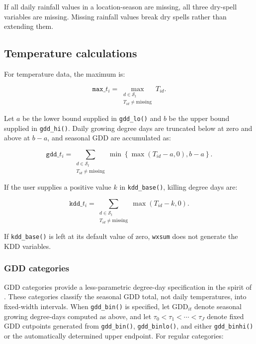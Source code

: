 If all daily rainfall values in a location-season are missing, all three dry-spell variables are missing. Missing rainfall values break dry spells rather than extending them.

\subsection{Temperature calculations}

For temperature data, the maximum is:

\begin{equation}
	\texttt{max\_} t_i = \max_{\substack{d \in \mathcal{S}_{t} \\ T_{id} \neq \text{missing}}} T_{id}.
\end{equation}

Let $a$ be the lower bound supplied in \texttt{gdd\_lo()} and $b$ be the upper bound supplied in \texttt{gdd\_hi()}. Daily growing degree days are truncated below at zero and above at $b - a$, and seasonal GDD are accumulated as:

\begin{equation}
	\texttt{gdd\_} t_i = \sum_{\substack{d \in \mathcal{S}_{t} \\ T_{id} \neq \text{missing}}} \min \left\{ \max \left(T_{id} - a, 0 \right), b - a \right\}.
\end{equation}

If the user supplies a positive value $k$ in \texttt{kdd\_base()}, killing degree days are:

\begin{equation}
	\texttt{kdd\_} t_i = \sum_{\substack{d \in \mathcal{S}_{t} \\ T_{id} \neq \text{missing}}} \max \left(T_{id} - k, 0 \right).
\end{equation}

\noindent If \texttt{kdd\_base()} is left at its default value of zero, \texttt{wxsum} does not generate the KDD variables.

\subsubsection{GDD categories}

GDD categories provide a less-parametric degree-day specification in the spirit of \citet{DescheneGreenstone07}. These categories classify the seasonal GDD total, not daily temperatures, into fixed-width intervals. When \texttt{gdd\_bin()} is specified, let $\text{GDD}_{it}$ denote seasonal growing degree-days computed as above, and let $\tau_0 < \tau_1 < \cdots < \tau_J$ denote fixed GDD cutpoints generated from \texttt{gdd\_bin()}, \texttt{gdd\_binlo()}, and either \texttt{gdd\_binhi()} or the automatically determined upper endpoint. For regular categories:

